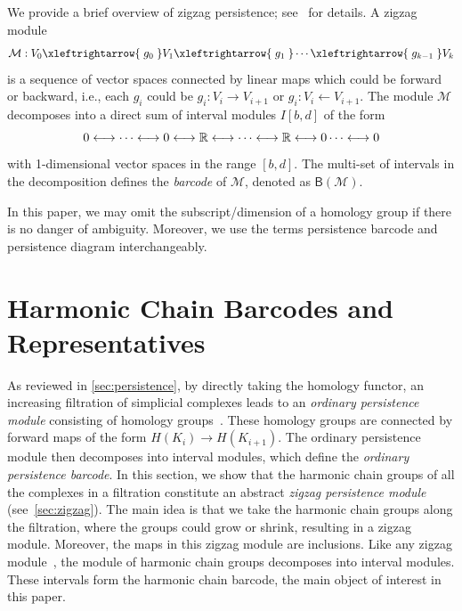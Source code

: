\documentclass[10pt,a4paper]{amsart}
\newcommand {\mm}[1] {\ifmmode{#1}\else{\mbox{\(#1\)}}\fi}
\newcommand{\Rspace}        {\mm{\mathbb{R}}}
\newcommand{\hcd}{{harmonic chain barcode}}
\newcommand{\para}[1]{\vspace{2mm}\noindent{\textbf{\sffamily{#1}}}\hspace{4pt}}
\theoremstyle{definition}
\newcommand{\lrarrowsp}[1]{\xleftrightarrow{\lbarrowspace#1\lbarrowspace}}
\newcommand{\Mcal}{\mathcal{M}}
\newcommand{\barc}{\mathsf{B}}
\newcommand{\lbarrowspace}{\;}
\theoremstyle{remark}
\begin{document}
We provide a brief overview of zigzag persistence; see~\cite{CarlssonSilva2010,CarlssonSilvaMorozov2009} for details.
A zigzag module 
\[\Mcal:V_0\lrarrowsp{g_0}V_1\lrarrowsp{g_1}\cdots\lrarrowsp{g_{k-1}}V_k\]
is a sequence of vector spaces connected by linear maps which could be forward or backward,
i.e., each $g_i$ could be $g_i:V_i\to V_{i+1}$ or $g_i:V_{i}\leftarrow V_{i+1}$.
The module $\Mcal$ decomposes into a direct sum of interval modules $I[b,d]$ of the form 
\[0 \longleftrightarrow \cdots \longleftrightarrow 0 \longleftrightarrow \Rspace \longleftrightarrow \cdots \longleftrightarrow \Rspace \longleftrightarrow 0 \cdots \longleftrightarrow 0 \]
with 1-dimensional vector spaces in the range $[b,d]$. 
The multi-set of intervals in the decomposition
defines the \emph{barcode} of $\Mcal$, denoted as $\barc(\Mcal)$.

\para{Conventions.}
In this paper, we may omit the subscript/dimension of a homology group if there is no danger of ambiguity. Moreover, we use the terms persistence barcode and persistence diagram interchangeably. 



\section{Harmonic Chain Barcodes and Representatives}
\label{sec:barcode-zigzag}

As reviewed in \cref{sec:persistence}, by directly taking the homology functor, an increasing filtration of simplicial complexes leads to an \emph{ordinary persistence module} consisting of homology groups~\cite{chazal2016structure,DeyWang2022}. These homology groups are connected by forward maps of the form $H(K_i) \xrightarrow{} H(K_{i+1})$. The ordinary persistence module then decomposes into interval  modules, which define the \emph{ordinary persistence barcode}. 
In this section, we show that the harmonic chain groups of all the complexes in a filtration constitute an abstract \emph{zigzag persistence module}  (see~\cref{sec:zigzag}). 
The main idea is that we take the harmonic chain groups along the filtration, where the groups could grow or shrink, resulting in a zigzag module. 
Moreover, the maps in this zigzag module are inclusions. 
Like any zigzag module~\cite{CarlssonSilva2010}, the module of harmonic chain groups decomposes into interval modules. These intervals form the {\hcd}, the main object of interest in this paper. 
\end{document}
